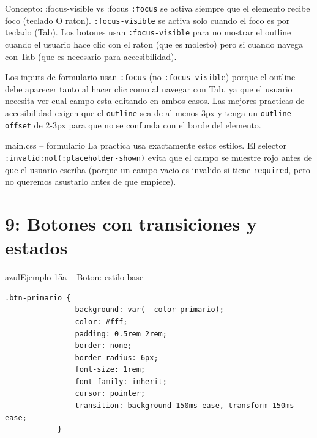\documentclass[11pt,a4paper]{article}
\begin{document}
	\begin{cajaconcepto}{Concepto: :focus-visible vs :focus}
		\texttt{:focus} se activa siempre que el elemento recibe foco (teclado O raton). \texttt{:focus-visible} se activa solo cuando el foco es por teclado (Tab). Los botones usan \texttt{:focus-visible} para no mostrar el outline cuando el usuario hace clic con el raton (que es molesto) pero si cuando navega con Tab (que es necesario para accesibilidad).
		
		Los inputs de formulario usan \texttt{:focus} (no \texttt{:focus-visible}) porque el outline debe aparecer tanto al hacer clic como al navegar con Tab, ya que el usuario necesita ver cual campo esta editando en ambos casos. Las mejores practicas de accesibilidad exigen que el \texttt{outline} sea de al menos 3px y tenga un \texttt{outline-offset} de 2-3px para que no se confunda con el borde del elemento.
	\end{cajaconcepto}
	
	\begin{cajapractica}{main.css -- formulario}
		La practica usa exactamente estos estilos. El selector \texttt{:invalid:not(:placeholder-shown)} evita que el campo se muestre rojo antes de que el usuario escriba (porque un campo vacio es invalido si tiene \texttt{required}, pero no queremos asustarlo antes de que empiece).
	\end{cajapractica}
	
	\section{9: Botones con transiciones y estados}
	
	\begin{cajacodigo}{azul}{Ejemplo 15a -- Boton: estilo base}
		\begin{lstlisting}[style=codecss]
			.btn-primario {
				background: var(--color-primario);
				color: #fff;
				padding: 0.5rem 2rem;
				border: none;
				border-radius: 6px;
				font-size: 1rem;
				font-family: inherit;
				cursor: pointer;
				transition: background 150ms ease, transform 150ms ease;
			}
		\end{lstlisting}
	\end{cajacodigo}
	
\end{document}
